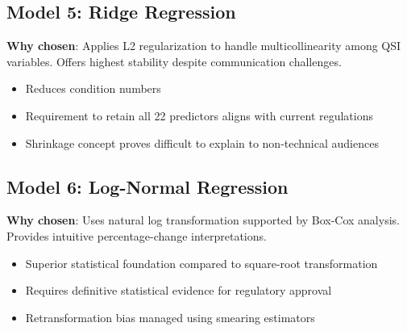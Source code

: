 \subsection{Model 5: Ridge Regression}
\textbf{Why chosen}: Applies L2 regularization to handle multicollinearity among QSI variables. Offers highest stability despite communication challenges.
\begin{itemize}
    \item Reduces condition numbers
    \item Requirement to retain all 22 predictors aligns with current regulations
    \item Shrinkage concept proves difficult to explain to non-technical audiences
\end{itemize}

\subsection{Model 6: Log-Normal Regression}
\textbf{Why chosen}: Uses natural log transformation supported by Box-Cox analysis. Provides intuitive percentage-change interpretations.
\begin{itemize}
    \item Superior statistical foundation compared to square-root transformation
    \item Requires definitive statistical evidence for regulatory approval
    \item Retransformation bias managed using smearing estimators
\end{itemize}


